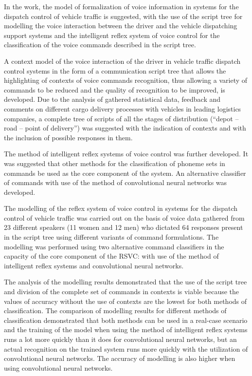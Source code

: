 In the work, the model of formalization of voice information in systems for the dispatch control of vehicle traffic is suggested, with the use of the script tree for modelling the voice interaction between the driver and the vehicle dispatching support systems and the intelligent reflex system of voice control for the classification of the voice commands described in the script tree.

A context model of the voice interaction of the driver in vehicle traffic dispatch control systems in the form of a communication script tree that allows the highlighting of contexts of voice commands recognition, thus allowing a variety of commands to be reduced and the quality of recognition to be improved, is developed. Due to the analysis of gathered statistical data, feedback and comments on different cargo delivery processes with vehicles in leading logistics companies, a complete tree of scripts of all the stages of distribution (“depot – road – point of delivery”) was suggested with the indication of contexts and with the inclusion of possible responses in them. 

The method of intelligent reflex systems of voice control was further developed. It was suggested that other methods for the classification of phoneme sets in commands be used as the core component of the system.  An alternative classifier of commands with use of the method of convolutional neural networks was developed. 

The modelling of the reflex system of voice control in systems for the dispatch control of vehicle traffic was carried out on the basis of voice data gathered from 23 different speakers (11 women and 12 men) who dictated 64 responses present in the script tree using different variants of command formulations. The modelling was performed using two alternative command classifiers in the capacity of the core component of the RSVC: with use of the method of intelligent reflex systems and convolutional neural networks. 

The analysis of the modelling results demonstrated that the use of the script tree and division of the complete set of commands in contexts is viable because the values of accuracy without the use of contexts are the lowest for both methods of classification. The comparison of modelling results for different methods of classification demonstrated that both methods can be used in a real-case scenario and the training of the model when using the method of intelligent reflex systems runs a lot more quickly than it does for convolutional neural networks, but an actual recognition on the trained system runs more quickly with the utilization of convolutional neural networks. The accuracy of modelling is also higher when using convolutional neural networks. 


